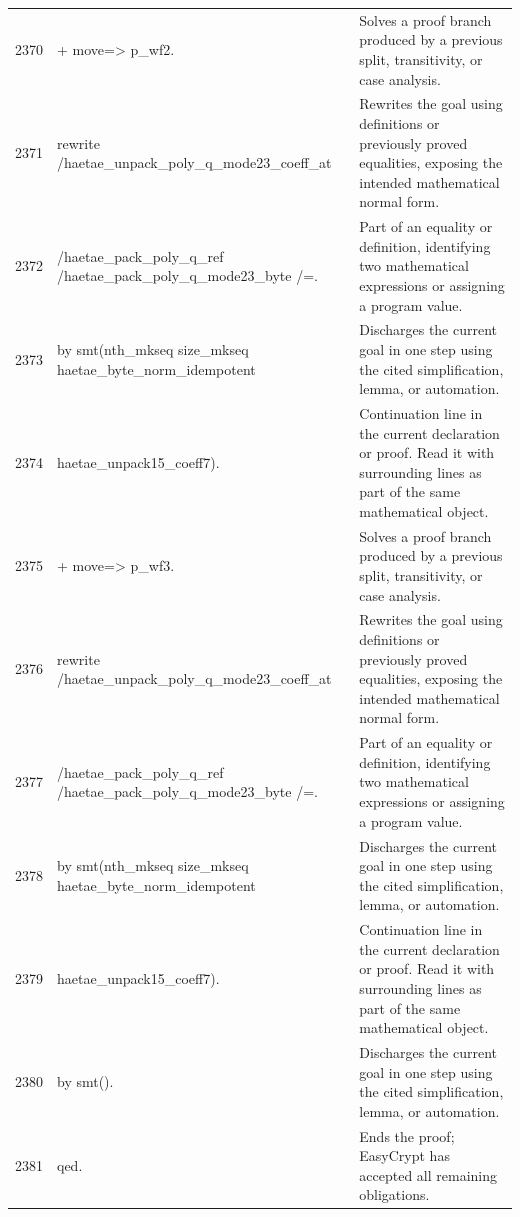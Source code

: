 \documentclass[10pt]{article}
\begin{document}
\begin{longtable}{r L{0.53\textwidth} L{0.37\textwidth}}
2370 & {\ttfamily\scriptsize + move=> p\_wf2.} & Solves a proof branch produced by a previous split, transitivity, or case analysis. \\
2371 & {\ttfamily\scriptsize   rewrite /haetae\_unpack\_poly\_q\_mode23\_coeff\_at} & Rewrites the goal using definitions or previously proved equalities, exposing the intended mathematical normal form. \\
2372 & {\ttfamily\scriptsize           /haetae\_pack\_poly\_q\_ref /haetae\_pack\_poly\_q\_mode23\_byte /=.} & Part of an equality or definition, identifying two mathematical expressions or assigning a program value. \\
2373 & {\ttfamily\scriptsize   by smt(nth\_mkseq size\_mkseq haetae\_byte\_norm\_idempotent} & Discharges the current goal in one step using the cited simplification, lemma, or automation. \\
2374 & {\ttfamily\scriptsize          haetae\_unpack15\_coeff7).} & Continuation line in the current declaration or proof.  Read it with surrounding lines as part of the same mathematical object. \\
2375 & {\ttfamily\scriptsize + move=> p\_wf3.} & Solves a proof branch produced by a previous split, transitivity, or case analysis. \\
2376 & {\ttfamily\scriptsize   rewrite /haetae\_unpack\_poly\_q\_mode23\_coeff\_at} & Rewrites the goal using definitions or previously proved equalities, exposing the intended mathematical normal form. \\
2377 & {\ttfamily\scriptsize           /haetae\_pack\_poly\_q\_ref /haetae\_pack\_poly\_q\_mode23\_byte /=.} & Part of an equality or definition, identifying two mathematical expressions or assigning a program value. \\
2378 & {\ttfamily\scriptsize   by smt(nth\_mkseq size\_mkseq haetae\_byte\_norm\_idempotent} & Discharges the current goal in one step using the cited simplification, lemma, or automation. \\
2379 & {\ttfamily\scriptsize          haetae\_unpack15\_coeff7).} & Continuation line in the current declaration or proof.  Read it with surrounding lines as part of the same mathematical object. \\
2380 & {\ttfamily\scriptsize by smt().} & Discharges the current goal in one step using the cited simplification, lemma, or automation. \\
2381 & {\ttfamily\scriptsize qed.} & Ends the proof; EasyCrypt has accepted all remaining obligations. \\

\end{longtable}
\end{document}
